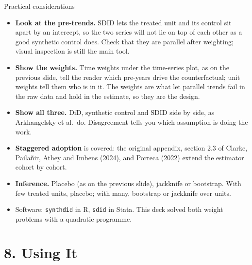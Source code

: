 \documentclass[
  11pt,
  ignorenonframetext,
  aspectratio=169,
]{beamer}
\providecommand{\tightlist}{%
  \setlength{\itemsep}{0pt}\setlength{\parskip}{0pt}}
\begin{document}
\begin{frame}[fragile]{Practical considerations}
\protect{}\label{practical-considerations}
\begin{itemize}
\tightlist
\item
  \textbf{Look at the pre-trends.} SDID lets the treated unit and its
  control sit apart by an intercept, so the two series will not lie on
  top of each other as a good synthetic control does. Check that they
  are parallel after weighting; visual inspection is still the main
  tool.
\item
  \textbf{Show the weights.} Time weights under the time-series plot, as
  on the previous slide, tell the reader which pre-years drive the
  counterfactual; unit weights tell them who is in it. The weights are
  what let parallel trends fail in the raw data and hold in the
  estimate, so they are the design.
\item
  \textbf{Show all three.} DiD, synthetic control and SDID side by side,
  as Arkhangelsky et al.~do. Disagreement tells you which assumption is
  doing the work.
\item
  \textbf{Staggered adoption} is covered: the original appendix, section
  2.3 of Clarke, Pailañir, Athey and Imbens (2024), and Porreca (2022)
  extend the estimator cohort by cohort.
\item
  \textbf{Inference.} Placebo (as on the previous slide), jackknife or
  bootstrap. With few treated units, placebo; with many, bootstrap or
  jackknife over units.
\item
  Software: \texttt{synthdid} in R, \texttt{sdid} in Stata. This deck
  solved both weight problems with a quadratic programme.
\end{itemize}
\end{frame}

\section{8. Using It}\label{using-it}
\end{document}
